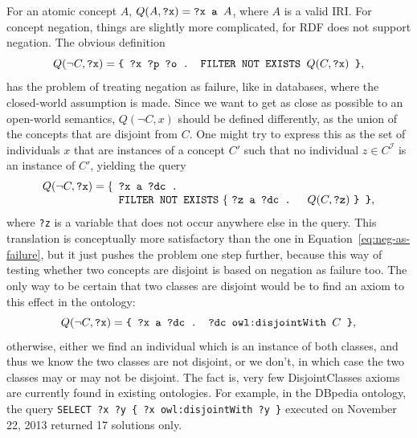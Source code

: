 \documentclass{llncs}
\begin{document}
For an atomic concept $A$, $Q(A, \mbox{\tt ?x}) = \mbox{\tt ?x a }A$,
where $A$ is a valid IRI.
For concept negation, things are slightly more complicated, for RDF does not support
negation.
The obvious definition
\begin{equation}\label{eq:neg-as-failure}
  Q(\neg C, \mbox{\tt ?x}) =
    \mbox{\tt \{ ?x ?p ?o . FILTER NOT EXISTS } Q(C, \mbox{\tt ?x}) \mbox{\tt\ \}},
\end{equation}
has the problem of treating negation as failure, like in databases,
where the closed-world assumption is made. 
Since we want to get as close as possible to an open-world semantics, $Q(\neg C, x)$ should be defined
differently, as the union of the concepts that are disjoint from $C$.
One might try to express this as the set of individuals $x$ that are instances of a
concept $C'$ such that no individual $z\in C^\mathcal{I}$ is an instance of $C'$,
yielding the query
\begin{equation}\label{eq:approx-open-world-negation}
  Q(\neg C, \mbox{\tt ?x}) =
  \begin{minipage}[t]{5in}
    \begin{tabbing}
      \quad\=\quad\=\quad\=\kill
      \{\>\texttt{?x a ?dc .}\\
        \>\texttt{FILTER NOT EXISTS} \{ \texttt{?z a ?dc . } $Q(C, \mbox{\tt ?z})$ \texttt{\} \}},
    \end{tabbing}
  \end{minipage}
\end{equation}
where \texttt{?z} is a variable that does not occur anywhere else in the query.
This translation is conceptually more satisfactory than the one in Equation~\ref{eq:neg-as-failure},
but it just pushes the problem one step further, because this way of testing whether
two concepts are disjoint is based on negation as failure too.
The only way to be certain that two classes are disjoint would be to find an axiom to
this effect in the ontology:
\begin{equation}\label{eq:negation-with-disjointWith}
  Q(\neg C, \mbox{\tt ?x}) =
    \mbox{\tt \{ ?x a ?dc . ?dc owl:disjointWith }
    C \mbox{\tt\ \}},
\end{equation}
otherwise, either we find an individual which is an instance of both classes,
and thus we know the two classes are not disjoint, or we don't,
in which case the two classes may or may not be disjoint.
The fact is, very few \textsf{DisjointClasses} axioms are currently found in existing
ontologies. For example, in the DBpedia ontology, the query
\texttt{SELECT ?x ?y \{ ?x owl:disjointWith ?y \}} executed on November 22, 2013
returned 17 solutions only.
\end{document}
